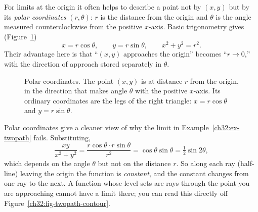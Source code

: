 For limits at the origin it often helps to describe a point not by $(x,y)$ but by its
\emph{polar coordinates} $(r,\theta)$: $r$ is the distance from the origin and $\theta$ is
the angle measured counterclockwise from the positive $x$-axis. Basic trigonometry gives
(Figure~\ref{ch32:fig-polar})
\[
   x = r\cos\theta, \qquad y = r\sin\theta, \qquad x^2+y^2 = r^2 .
\]
Their advantage here is that ``$(x,y)$ approaches the origin'' becomes ``$r\to 0$,'' with the
direction of approach stored separately in $\theta$.

\begin{figure}[htbp]
\centering
{}
\caption{Polar coordinates. The point $(x,y)$ is at distance $r$ from the origin, in the
direction that makes angle $\theta$ with the positive $x$-axis. Its ordinary coordinates are
the legs of the right triangle: $x=r\cos\theta$ and $y=r\sin\theta$.}
\label{ch32:fig-polar}
\end{figure}

Polar coordinates give a cleaner view of why the limit in Example~\ref{ch32:ex-twopath} fails.
Substituting,
\[
   \frac{xy}{x^2+y^2} = \frac{r\cos\theta\cdot r\sin\theta}{r^2} = \cos\theta\sin\theta
   = \tfrac12\sin 2\theta ,
\]
which depends on the angle $\theta$ but not on the distance $r$. So along each ray (half-line)
leaving the origin the function is \emph{constant}, and the constant changes from one ray to
the next. A function whose level sets are rays through the point you are approaching cannot
have a limit there; you can read this directly off Figure~\ref{ch32:fig-twopath-contour}.

